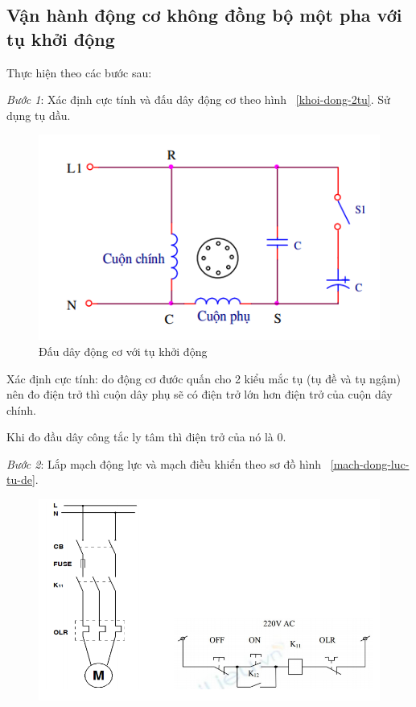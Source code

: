 \documentclass[13pt,a4paper]{extarticle}
\begin{document}
\subsection{Vận hành động cơ không đồng bộ một pha với tụ khởi động}\label{Sec:1tu}
Thực hiện theo các bước sau:
\begin{list}{--}{}
\item \textit{Bước 1}: Xác định cực tính và đấu dây động cơ theo hình ~\ref{khoi-dong-2tu}. Sử dụng tụ dầu.
\begin{figure}[!h]
\begin{center}
\includegraphics[scale=.5]{khoi-dong-2tu}
\end{center}
\caption{Đấu dây động cơ với tụ khởi động}\label{khoi-dong-tu}
\end{figure}
\begin{list}{+}{}
\item Xác định cực tính: do động cơ đước quấn cho 2 kiểu mắc tụ (tụ đề và tụ ngậm) nên đo điện trở thì cuộn dây phụ sẽ có điện trở lớn hơn điện trở của cuộn dây chính.
\item Khi đo đầu dây công tắc ly tâm thì điện trở của nó là 0.
\end{list}
\item \textit{Bước 2}: Lắp mạch động lực và mạch điều khiển theo sơ đồ hình ~\ref{mach-dong-luc-tu-de}.
\begin{figure}[!h]
\begin{center}
\includegraphics[scale=.6]{mach-dluc-dkhien}

\end{center}
\end{figure}
\end{list}
\end{document}
